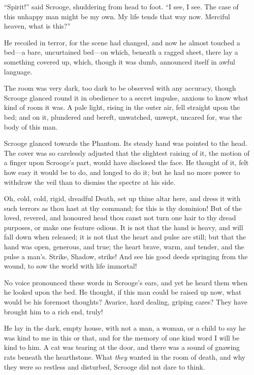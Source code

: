 \documentclass[paper=5.5in:8.5in,BCOR=15mm,twoside,DIV=15,headinclude=off,12pt,chapterprefix=off,openany,headings=huge]{scrbook} %
\begin{document}
\enquote{Spirit!} said Scrooge, shuddering from head to foot. \enquote{I see, I see. The case of this unhappy man might be my own. My life tends that way now. Merciful heaven, what is this?}

He recoiled in terror, for the scene had changed, and now he almost touched a bed—a bare, uncurtained bed—on which, beneath a ragged sheet, there lay a something covered up, which, though it was dumb, announced itself in awful language.

The room was very dark, too dark to be observed with any accuracy, though Scrooge glanced round it in obedience to a secret impulse, anxious to know what kind of room it was. A pale light, rising in the outer air, fell straight upon the bed; and on it, plundered and bereft, unwatched, unwept, uncared for, was the body of this man.

Scrooge glanced towards the Phantom. Its steady hand was pointed to the head. The cover was so carelessly adjusted that the slightest raising of it, the motion of a finger upon Scrooge's part, would have disclosed the face. He thought of it, felt how easy it would be to do, and longed to do it; but he had no more power to withdraw the veil than to dismiss the spectre at his side.

Oh, cold, cold, rigid, dreadful Death, set up thine altar here, and dress it with such terrors as thou hast at thy command; for this is thy dominion! But of the loved, revered, and honoured head thou canst not turn one hair to thy dread purposes, or make one feature odious. It is not that the hand is heavy, and will fall down when released; it is not that the heart and pulse are still; but that the hand was open, generous, and true; the heart brave, warm, and tender, and the pulse a man's. Strike, Shadow, strike! And see his good deeds springing from the wound, to sow the world with life immortal!

No voice pronounced these words in Scrooge's ears, and yet he heard them when he looked upon the bed. He thought, if this man could be raised up now, what would be his foremost thoughts? Avarice, hard dealing, griping cares? They have brought him to a rich end, truly!

He lay in the dark, empty house, with not a man, a woman, or a child to say he was kind to me in this or that, and for the memory of one kind word I will be kind to him. A cat was tearing at the door, and there was a sound of gnawing rats beneath the hearthstone. What \textit{they} wanted in the room of death, and why they were so restless and disturbed, Scrooge did not dare to think.
\end{document}
